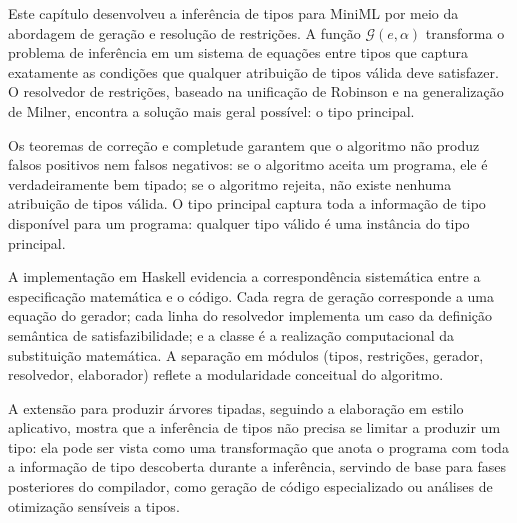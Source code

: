   Este capítulo desenvolveu a inferência de tipos para MiniML por meio
  da abordagem de geração e resolução de restrições. A função
  \(\mathcal{G}(e, \alpha)\) transforma o
  problema de inferência em um sistema de equações entre tipos que
  captura exatamente as condições que qualquer atribuição de tipos
  válida deve satisfazer. O resolvedor de restrições, baseado na
  unificação de Robinson e na generalização de Milner, encontra a
  solução mais geral possível: o tipo principal.

  Os teoremas de correção e completude garantem que o algoritmo não
  produz falsos positivos nem falsos negativos: se o algoritmo aceita
  um programa, ele é verdadeiramente bem tipado; se o algoritmo
  rejeita, não existe nenhuma atribuição de tipos válida. O tipo
  principal captura toda a informação de tipo disponível para um
  programa: qualquer tipo válido é uma instância do tipo principal.

  A implementação em Haskell evidencia a correspondência sistemática
  entre a especificação matemática e o código. Cada regra de geração
  corresponde a uma equação do gerador; cada linha do resolvedor
  implementa um caso da definição semântica de satisfazibilidade; e a
  classe  é a realização computacional
  da substituição matemática. A separação em módulos (tipos,
  restrições, gerador, resolvedor, elaborador) reflete a
  modularidade conceitual do algoritmo.

  A extensão para produzir árvores tipadas, seguindo a elaboração em
  estilo aplicativo, mostra que a inferência de tipos não precisa se
  limitar a produzir um tipo: ela pode ser vista como uma transformação
  que anota o programa com toda a informação de tipo descoberta durante
  a inferência, servindo de base para fases posteriores do compilador,
  como geração de código especializado ou análises de otimização
  sensíveis a tipos.
